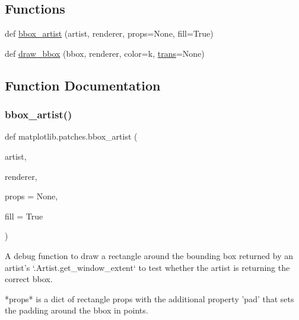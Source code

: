 \subsection*{Functions}
\begin{DoxyCompactItemize}
\item 
def \hyperlink{namespacematplotlib_1_1patches_a80998fa8aa28b88a580566975de1c8fa}{bbox\+\_\+artist} (artist, renderer, props=None, fill=True)
\item 
def \hyperlink{namespacematplotlib_1_1patches_a9bc191a53118aba65453de08654f4052}{draw\+\_\+bbox} (bbox, renderer, color=\textquotesingle{}k\textquotesingle{}, \hyperlink{size_2foo_8f90_afabfd8da71309850231a00e53c61f106}{trans}=None)
\end{DoxyCompactItemize}


\subsection{Function Documentation}
\mbox{\label{namespacematplotlib_1_1patches_a80998fa8aa28b88a580566975de1c8fa}} 
\subsubsection{\texorpdfstring{bbox\+\_\+artist()}{bbox\_artist()}}
{\footnotesize\ttfamily def matplotlib.\+patches.\+bbox\+\_\+artist (\begin{DoxyParamCaption}\item[{}]{artist,  }\item[{}]{renderer,  }\item[{}]{props = {\ttfamily None},  }\item[{}]{fill = {\ttfamily True} }\end{DoxyParamCaption})}

\begin{DoxyVerb}A debug function to draw a rectangle around the bounding
box returned by an artist's `.Artist.get_window_extent`
to test whether the artist is returning the correct bbox.

*props* is a dict of rectangle props with the additional property
'pad' that sets the padding around the bbox in points.
\end{DoxyVerb}
 \mbox{\label{namespacematplotlib_1_1patches_a9bc191a53118aba65453de08654f4052}} 

